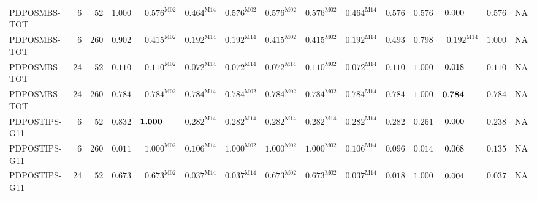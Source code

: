 \begin{longtable}{@{}lrrrrrrrrrrrrrr@{}}
PDPOSMBS-TOT & 6 & 52 & $\mathbf{1.000}$ & $\mathbf{0.576}^{\mathrm{M02}}$ & $\mathbf{0.464}^{\mathrm{M14}}$ & $\mathbf{0.576}^{\mathrm{M02}}$ & $\mathbf{0.576}^{\mathrm{M02}}$ & $\mathbf{0.576}^{\mathrm{M02}}$ & $\mathbf{0.464}^{\mathrm{M14}}$ & $\mathbf{0.576}$ & $\mathbf{0.576}$ & $0.000\hphantom{^{\mathrm{M00}}}$ & $\mathbf{0.576}$ & \textsc{NA} \\
PDPOSMBS-TOT & 6 & 260 & $\mathbf{0.902}$ & $\mathbf{0.415}^{\mathrm{M02}}$ & $\mathbf{0.192}^{\mathrm{M14}}$ & $\mathbf{0.192}^{\mathrm{M14}}$ & $\mathbf{0.415}^{\mathrm{M02}}$ & $\mathbf{0.415}^{\mathrm{M02}}$ & $\mathbf{0.192}^{\mathrm{M14}}$ & $\mathbf{0.493}$ & $\mathbf{0.798}$ & $\mathbf{0.192}^{\mathrm{M14}}$ & $\mathbf{1.000}$ & \textsc{NA} \\
PDPOSMBS-TOT & 24 & 52 & $\mathbf{0.110}$ & $\mathbf{0.110}^{\mathrm{M02}}$ & $0.072^{\mathrm{M14}}$ & $0.072^{\mathrm{M14}}$ & $0.072^{\mathrm{M14}}$ & $\mathbf{0.110}^{\mathrm{M02}}$ & $0.072^{\mathrm{M14}}$ & $\mathbf{0.110}$ & $\mathbf{1.000}$ & $0.018\hphantom{^{\mathrm{M00}}}$ & $\mathbf{0.110}$ & \textsc{NA} \\
PDPOSMBS-TOT & 24 & 260 & $\mathbf{0.784}$ & $\mathbf{0.784}^{\mathrm{M02}}$ & $\mathbf{0.784}^{\mathrm{M14}}$ & $\mathbf{0.784}^{\mathrm{M02}}$ & $\mathbf{0.784}^{\mathrm{M02}}$ & $\mathbf{0.784}^{\mathrm{M02}}$ & $\mathbf{0.784}^{\mathrm{M14}}$ & $\mathbf{0.784}$ & $\mathbf{1.000}$ & $\mathbf{0.784}\hphantom{^{\mathrm{M00}}}$ & $\mathbf{0.784}$ & \textsc{NA} \\
PDPOSTIPS-G11 & 6 & 52 & $\mathbf{0.832}$ & $\mathbf{1.000}\hphantom{^{\mathrm{M00}}}$ & $\mathbf{0.282}^{\mathrm{M14}}$ & $\mathbf{0.282}^{\mathrm{M14}}$ & $\mathbf{0.282}^{\mathrm{M14}}$ & $\mathbf{0.282}^{\mathrm{M14}}$ & $\mathbf{0.282}^{\mathrm{M14}}$ & $\mathbf{0.282}$ & $\mathbf{0.261}$ & $0.000\hphantom{^{\mathrm{M00}}}$ & $\mathbf{0.238}$ & \textsc{NA} \\
PDPOSTIPS-G11 & 6 & 260 & $0.011$ & $\mathbf{1.000}^{\mathrm{M02}}$ & $\mathbf{0.106}^{\mathrm{M14}}$ & $\mathbf{1.000}^{\mathrm{M02}}$ & $\mathbf{1.000}^{\mathrm{M02}}$ & $\mathbf{1.000}^{\mathrm{M02}}$ & $\mathbf{0.106}^{\mathrm{M14}}$ & $0.096$ & $0.014$ & $0.068\hphantom{^{\mathrm{M00}}}$ & $\mathbf{0.135}$ & \textsc{NA} \\
PDPOSTIPS-G11 & 24 & 52 & $\mathbf{0.673}$ & $\mathbf{0.673}^{\mathrm{M02}}$ & $0.037^{\mathrm{M14}}$ & $0.037^{\mathrm{M14}}$ & $\mathbf{0.673}^{\mathrm{M02}}$ & $\mathbf{0.673}^{\mathrm{M02}}$ & $0.037^{\mathrm{M14}}$ & $0.018$ & $\mathbf{1.000}$ & $0.004\hphantom{^{\mathrm{M00}}}$ & $0.037$ & \textsc{NA} \\

\end{longtable}
